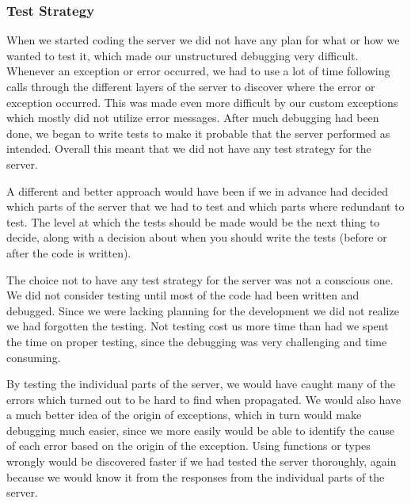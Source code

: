 \subsubsection{Test Strategy}
When we started coding the server we did not have any plan for what or how we wanted to test it, which made our unstructured debugging very difficult.
Whenever an exception or error occurred, we had to use a lot of time following calls through the different layers of the server to discover where the error or exception occurred.
This was made even more difficult by our custom exceptions which mostly did not utilize error messages.
After much debugging had been done, we began to write tests to make it probable that the server performed as intended.
Overall this meant that we did not have any test strategy for the server.

A different and better approach would have been if we in advance had decided which parts of the server that we had to test and which parts where redundant to test.
The level at which the tests should be made would be the next thing to decide, along with a decision about when you should write the tests (before or after the code is written).

The choice not to have any test strategy for the server was not a conscious one.
We did not consider testing until most of the code had been written and debugged.
Since we were lacking planning for the development we did not realize we had forgotten the testing.
Not testing cost us more time than had we spent the time on proper testing, since the debugging was very challenging and time consuming.

By testing the individual parts of the server, we would have caught many of the errors which turned out to be hard to find when propagated.
We would also have a much better idea of the origin of exceptions, which in turn would make debugging much easier, since we more easily would be able to identify the cause of each error based on the origin of the exception.
Using functions or types wrongly would be discovered faster if we had tested the server thoroughly, again because we would know it from the responses from the individual parts of the server.